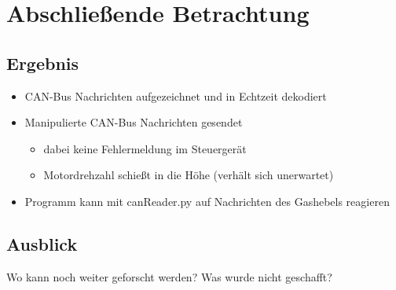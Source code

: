 \chapter{Abschließende Betrachtung}

\section{Ergebnis}
\begin{itemize}
    \item CAN-Bus Nachrichten aufgezeichnet und in Echtzeit dekodiert
    \item Manipulierte CAN-Bus Nachrichten gesendet \begin{itemize}
        \item dabei keine Fehlermeldung im Steuergerät
        \item Motordrehzahl schießt in die Höhe (verhält sich unerwartet)
    \end{itemize}
    \item Programm kann mit canReader.py auf Nachrichten des Gashebels reagieren
\end{itemize}

\section{Ausblick}
Wo kann noch weiter geforscht werden?
Was wurde nicht geschafft?